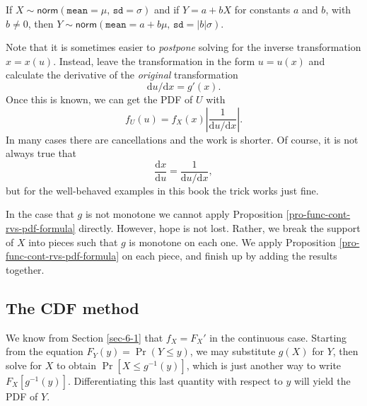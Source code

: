 \documentclass[captions=tableheading]{scrbook}
\begin{document}
\begin{fact}
If \(X\sim\mathsf{norm}(\mathtt{mean}=\mu,\,\mathtt{sd}=\sigma)\) and if \(Y=a+bX\) for constants \(a\) and \(b\), with \(b\neq0\), then \(Y\sim\mathsf{norm}(\mathtt{mean}=a+b\mu,\,\mathtt{sd}=|b|\sigma)\). 
\end{fact}

Note that it is sometimes easier to \emph{postpone} solving for the inverse transformation \(x=x(u)\). Instead, leave the transformation in the form \(u=u(x)\) and calculate the derivative of the \emph{original} transformation
\begin{equation}
\mathrm{d} u/\mathrm{d} x=g'(x).
\end{equation}
Once this is known, we can get the PDF of \(U\) with
\begin{equation}
f_{U}(u)=f_{X}(x)\left|\frac{1}{\mathrm{d} u/\mathrm{d} x}\right|.
\end{equation}
In many cases there are cancellations and the work is shorter. Of course, it is not always true that
\begin{equation}
\frac{\mathrm{d} x}{\mathrm{d} u}=\frac{1}{\mathrm{d} u/\mathrm{d} x},\label{eq-univ-jacob-recip}
\end{equation}
but for the well-behaved examples in this book the trick works just fine.

\begin{rem}
In the case that \(g\) is not monotone we cannot apply Proposition \ref{pro-func-cont-rvs-pdf-formula} directly. However, hope is not lost. Rather, we break the support of \(X\) into pieces such that \(g\) is monotone on each one. We apply Proposition \ref{pro-func-cont-rvs-pdf-formula} on each piece, and finish up by adding the results together.
\end{rem}
\subsection{The CDF method}
\label{sec-6-4-2}


We know from Section \ref{sec-6-1} that \(f_{X}=F_{X}'\) in the continuous case. Starting from the equation \(F_{Y}(y)=\Pr(Y\leq y)\), we may substitute \(g(X)\) for \(Y\), then solve for \(X\) to obtain \(\Pr[X\leq g^{-1}(y)]\), which is just another way to write \(F_{X}[g^{-1}(y)]\). Differentiating this last quantity with respect to \(y\) will yield the PDF of \(Y\).
\end{document}
